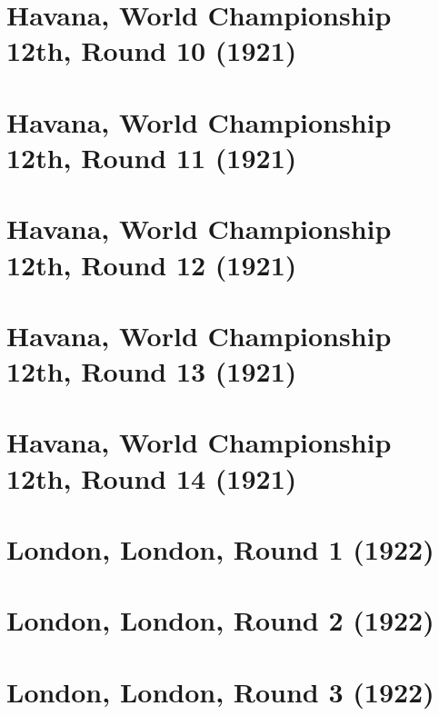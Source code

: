 \documentclass[11pt]{article}
\begin{document}
\clearpage

\section{Havana, World Championship 12th, Round 10 (1921)}


\clearpage

\section{Havana, World Championship 12th, Round 11 (1921)}


\clearpage

\section{Havana, World Championship 12th, Round 12 (1921)}


\clearpage

\section{Havana, World Championship 12th, Round 13 (1921)}


\clearpage

\section{Havana, World Championship 12th, Round 14 (1921)}


\clearpage

\section{London, London, Round 1 (1922)}


\clearpage

\section{London, London, Round 2 (1922)}


\clearpage

\section{London, London, Round 3 (1922)}

\end{document}
